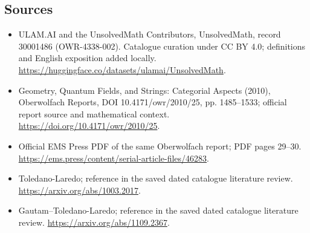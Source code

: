 \documentclass[11pt]{article}
\begin{document}
\subsection{Sources}
\begin{itemize}
\item[\hypertarget{source:30001486:1}{S1}] ULAM.AI and the UnsolvedMath Contributors, UnsolvedMath, record 30001486 (OWR-4338-002). Catalogue curation under CC BY 4.0; definitions and English exposition added locally.
\url{https://huggingface.co/datasets/ulamai/UnsolvedMath}.
\item[\hypertarget{source:30001486:2}{S2}] Geometry, Quantum Fields, and Strings: Categorial Aspects (2010), Oberwolfach Reports, DOI 10.4171/owr/2010/25, pp. 1485--1533; official report source and mathematical context.
\url{https://doi.org/10.4171/owr/2010/25}.
\item[\hypertarget{source:30001486:3}{S3}] Official EMS Press PDF of the same Oberwolfach report; PDF pages 29--30.
\url{https://ems.press/content/serial-article-files/46283}.
\item[\hypertarget{source:30001486:4}{S4}] Toledano-Laredo; reference in the saved dated catalogue literature review.
\url{https://arxiv.org/abs/1003.2017}.
\item[\hypertarget{source:30001486:5}{S5}] Gautam--Toledano-Laredo; reference in the saved dated catalogue literature review.
\url{https://arxiv.org/abs/1109.2367}.
\end{itemize}
\label{end:30001486}
\end{document}
